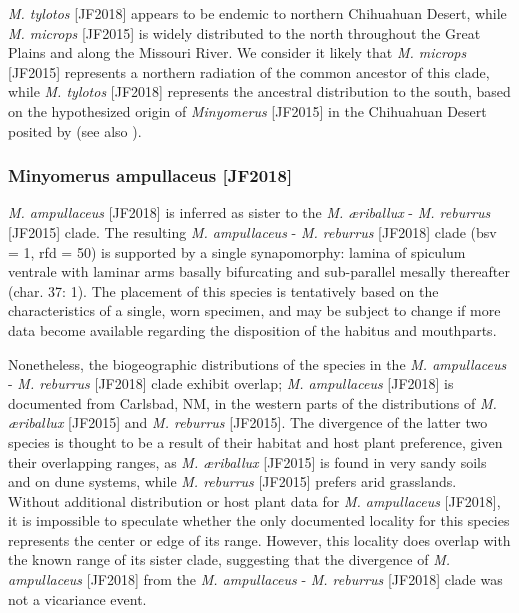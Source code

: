 \documentclass[fleqn,10pt,lineno]{wlpeerj} %
\begin{document}
			\textit{M. tylotos} [JF2018] appears to be endemic to northern Chihuahuan Desert, while \textit{M. microps} [JF2015] is widely distributed to the north throughout the Great Plains and along the Missouri River.
			We consider it likely that \textit{M. microps} [JF2015] represents a northern radiation of the common ancestor of this clade, while \textit{M. tylotos} [JF2018] represents the ancestral distribution to the south, based on the hypothesized origin of \textit{Minyomerus} [JF2015] in the Chihuahuan Desert posited by \citet{jansen2015} (see also \citealt{wilson2010}).
			
			
		\subsubsection*{Minyomerus ampullaceus \textnormal{\bfseries[JF2018]}}
			\textit{M. ampullaceus} [JF2018] is inferred as sister to the \textit{M. {\ae}riballux} - \textit{M. reburrus} [JF2015] clade.
			The resulting \textit{M. ampullaceus} - \textit{M. reburrus} [JF2018] clade (bsv = 1, rfd = 50) is supported by a single synapomorphy: lamina of spiculum ventrale with laminar arms basally bifurcating and sub-parallel mesally thereafter (char. 37: 1).
			The placement of this species is tentatively based on the characteristics of a single, worn specimen, and may be subject to change if more data become available regarding the disposition of the habitus and mouthparts.
			
			Nonetheless, the biogeographic distributions of the species in the \textit{M. ampullaceus} - \textit{M. reburrus} [JF2018] clade exhibit overlap; \textit{M. ampullaceus} [JF2018] is documented from Carlsbad, NM, in the western parts of the distributions of \textit{M. {\ae}riballux} [JF2015] and \textit{M. reburrus} [JF2015]. 
			The divergence of the latter two species is thought to be a result of their habitat and host plant preference, given their overlapping ranges, as \textit{M. {\ae}riballux} [JF2015] is found in very sandy soils and on dune systems, while \textit{M. reburrus} [JF2015] prefers arid grasslands.
			Without additional distribution or host plant data for \textit{M. ampullaceus} [JF2018], it is impossible to speculate whether the only documented locality for this species represents the center or edge of its range.
			However, this locality does overlap with the known range of its sister clade, suggesting that the divergence of \textit{M. ampullaceus} [JF2018] from the \textit{M. ampullaceus} - \textit{M. reburrus} [JF2018] clade was not a vicariance event.
			
\end{document}
